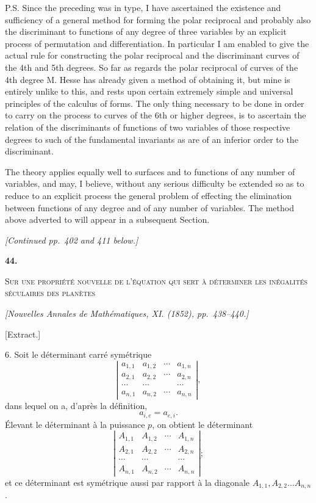\documentclass[11pt]{article}
\newcommand{\paperhead}[3]{%
  \clearpage
  \begin{center}
  {\Large\bfseries #1.}\par\vspace{0.85em}
  {\large\scshape #2}\par\vspace{0.6em}
  {\itshape [#3]}\par
  \end{center}\vspace{0.4em}}
\newcommand{\sourcepage}[1]{\marginpar{\scriptsize p.~#1}}
\begin{document}
{{\sourcepage{363}
P.S. Since the preceding was in type, I have ascertained the existence and sufficiency of a general method for forming the polar reciprocal and probably also the discriminant to functions of any degree of three variables by an explicit process of permutation and differentiation. In particular I am enabled to give the actual rule for constructing the polar reciprocal and the discriminant curves of the 4th and 5th degrees. So far as regards the polar reciprocal of curves of the 4th degree M. Hesse has already given a method of obtaining it, but mine is entirely unlike to this, and rests upon certain extremely simple and universal principles of the calculus of forms. The only thing necessary to be done in order to carry on the process to curves of the 6th or higher degrees, is to ascertain the relation of the discriminants of functions of two variables of those respective degrees to such of the fundamental invariants as are of an inferior order to the discriminant.

The theory applies equally well to surfaces and to functions of any number of variables, and may, I believe, without any serious difficulty be extended so as to reduce to an explicit process the general problem of effecting the elimination between functions of any degree and of any number of variables. The method above adverted to will appear in a subsequent Section.

\begin{center}\emph{[Continued pp.~402 and 411 below.]}\end{center}

\paperhead{44}{Sur une propriété nouvelle de l'équation qui sert à déterminer les inégalités séculaires des planètes}{Nouvelles Annales de Mathématiques, XI. (1852), pp.~438--440.}

\begin{center}[Extract.]\end{center}

\sourcepage{364}
6. Soit le déterminant carré symétrique
\[
\left|\begin{array}{cccc}
a_{1,1}&a_{1,2}&\cdots&a_{1,n}\\
a_{2,1}&a_{2,2}&\cdots&a_{2,n}\\
\cdots&\cdots&&\cdots\\
a_{n,1}&a_{n,2}&\cdots&a_{n,n}
\end{array}\right|,
\tag{M}
\]
dans lequel on a, d'après la définition,
\[
a_{i,e}=a_{e,i}.
\]
Élevant le déterminant à la puissance $p$, on obtient le déterminant
\[
\left|\begin{array}{cccc}
A_{1,1}&A_{1,2}&\cdots&A_{1,n}\\
A_{2,1}&A_{2,2}&\cdots&A_{2,n}\\
\cdots&\cdots&&\cdots\\
A_{n,1}&A_{n,2}&\cdots&A_{n,n}
\end{array}\right|;
\tag{N}
\]
et ce déterminant est symétrique aussi par rapport à la diagonale $A_{1,1},A_{2,2}\ldots A_{n,n}$.

}}
\end{document}
